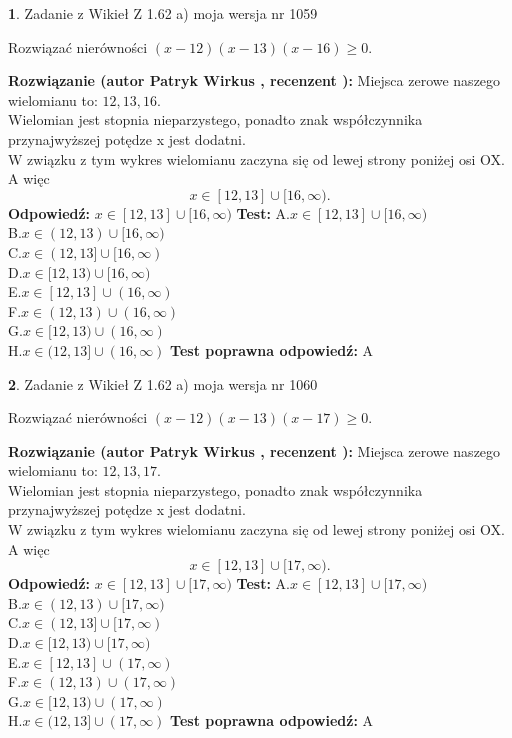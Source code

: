 \documentclass[12pt, a4paper]{article}
\theoremstyle{definition} %
\newtheorem{zad}{}
\newcommand{\zadStart}[1]{\begin{zad}#1\newline}
\newcommand{\zadStop}{\end{zad}}
\newcommand{\rozwStart}[2]{\noindent \textbf{Rozwiązanie (autor #1 , recenzent #2): }\newline}
\newcommand{\rozwStop}{\newline}
\newcommand{\odpStart}{\noindent \textbf{Odpowiedź:}\newline}
\newcommand{\odpStop}{\newline}
\newcommand{\testStart}{\noindent \textbf{Test:}\newline}
\newcommand{\testStop}{\newline}
\newcommand{\kluczStart}{\noindent \textbf{Test poprawna odpowiedź:}\newline}
\newcommand{\kluczStop}{\newline}
\begin{document}
\zadStart{Zadanie z Wikieł Z 1.62 a) moja wersja nr 1059}

Rozwiązać nierówności $(x-12)(x-13)(x-16)\ge0$.
\zadStop
\rozwStart{Patryk Wirkus}{}
Miejsca zerowe naszego wielomianu to: $12, 13, 16$.\\
Wielomian jest stopnia nieparzystego, ponadto znak współczynnika przy\linebreak najwyższej potędze x jest dodatni.\\ W związku z tym wykres wielomianu zaczyna się od lewej strony poniżej osi OX. A więc $$x \in [12,13] \cup [16,\infty).$$
\rozwStop
\odpStart
$x \in [12,13] \cup [16,\infty)$
\odpStop
\testStart
A.$x \in [12,13] \cup [16,\infty)$\\
B.$x \in (12,13) \cup [16,\infty)$\\
C.$x \in (12,13] \cup [16,\infty)$\\
D.$x \in [12,13) \cup [16,\infty)$\\
E.$x \in [12,13] \cup (16,\infty)$\\
F.$x \in (12,13) \cup (16,\infty)$\\
G.$x \in [12,13) \cup (16,\infty)$\\
H.$x \in (12,13] \cup (16,\infty)$
\testStop
\kluczStart
A
\kluczStop



\zadStart{Zadanie z Wikieł Z 1.62 a) moja wersja nr 1060}

Rozwiązać nierówności $(x-12)(x-13)(x-17)\ge0$.
\zadStop
\rozwStart{Patryk Wirkus}{}
Miejsca zerowe naszego wielomianu to: $12, 13, 17$.\\
Wielomian jest stopnia nieparzystego, ponadto znak współczynnika przy\linebreak najwyższej potędze x jest dodatni.\\ W związku z tym wykres wielomianu zaczyna się od lewej strony poniżej osi OX. A więc $$x \in [12,13] \cup [17,\infty).$$
\rozwStop
\odpStart
$x \in [12,13] \cup [17,\infty)$
\odpStop
\testStart
A.$x \in [12,13] \cup [17,\infty)$\\
B.$x \in (12,13) \cup [17,\infty)$\\
C.$x \in (12,13] \cup [17,\infty)$\\
D.$x \in [12,13) \cup [17,\infty)$\\
E.$x \in [12,13] \cup (17,\infty)$\\
F.$x \in (12,13) \cup (17,\infty)$\\
G.$x \in [12,13) \cup (17,\infty)$\\
H.$x \in (12,13] \cup (17,\infty)$
\testStop
\kluczStart
A
\kluczStop
\end{document}
